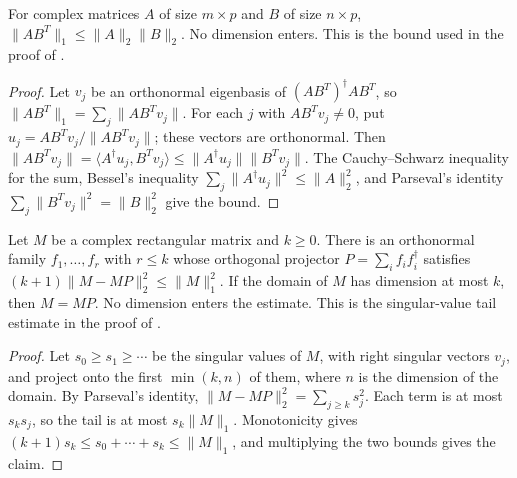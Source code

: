 \begin{theorem}
    \label{thm:random_trace_holder}
    \leanok
    For complex matrices $A$ of size $m\times p$ and $B$ of size $n\times p$,
    $\lVert AB^T\rVert_1\leq\lVert A\rVert_2\lVert B\rVert_2$. No dimension
    enters. This is the bound used in the proof of
    \cite[Lemma~6.2]{OpenAI2026PolynomialPEPS}.
\end{theorem}

\begin{proof}\leanok
    Let $v_j$ be an orthonormal eigenbasis of $(AB^T)^\dagger AB^T$, so
    $\lVert AB^T\rVert_1=\sum_j\lVert AB^Tv_j\rVert$. For each $j$ with
    $AB^Tv_j\neq0$, put $u_j=AB^Tv_j/\lVert AB^Tv_j\rVert$; these vectors
    are orthonormal. Then
    $\lVert AB^Tv_j\rVert=\langle A^\dagger u_j,B^Tv_j\rangle
        \leq\lVert A^\dagger u_j\rVert\lVert B^Tv_j\rVert$.
    The Cauchy--Schwarz inequality for the sum, Bessel's inequality
    $\sum_j\lVert A^\dagger u_j\rVert^2\leq\lVert A\rVert_2^2$, and
    Parseval's identity $\sum_j\lVert B^Tv_j\rVert^2=\lVert B\rVert_2^2$
    give the bound.
\end{proof}

\begin{theorem}
    \label{thm:random_trace_truncation}
    \leanok
    Let $M$ be a complex rectangular matrix and $k\geq0$. There is an
    orthonormal family $f_1,\dots,f_r$ with $r\leq k$ whose orthogonal
    projector $P=\sum_i f_if_i^\dagger$ satisfies
    $(k+1)\lVert M-MP\rVert_2^2\leq\lVert M\rVert_1^2$. If the domain of
    $M$ has dimension at most $k$, then $M=MP$. No dimension enters the
    estimate. This is the singular-value tail estimate in the proof of
    \cite[Lemma~6.2]{OpenAI2026PolynomialPEPS}.
\end{theorem}

\begin{proof}\leanok
    Let $s_0\geq s_1\geq\cdots$ be the singular values of $M$, with right
    singular vectors $v_j$, and project onto the first $\min(k,n)$ of
    them, where $n$ is the dimension of the domain. By Parseval's identity,
    $\lVert M-MP\rVert_2^2=\sum_{j\geq k}s_j^2$. Each term is at most
    $s_ks_j$, so the tail is at most $s_k\lVert M\rVert_1$. Monotonicity
    gives $(k+1)s_k\leq s_0+\cdots+s_k\leq\lVert M\rVert_1$, and
    multiplying the two bounds gives the claim.
\end{proof}

